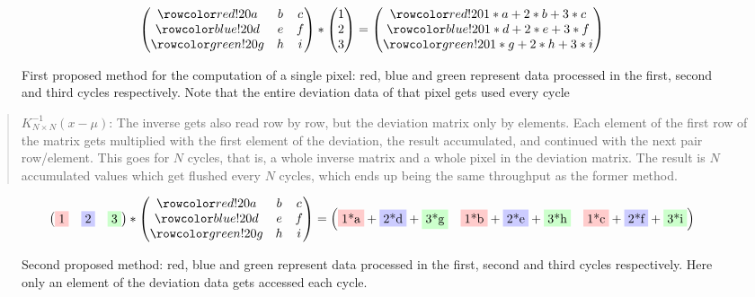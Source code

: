 \begin{figure}[h]%
\[
\begin{pmatrix}
\rr a & b & c \\ 
\br d & e & f \\ 
\gr g & h & i
\end{pmatrix}
*
\begin{pmatrix}
1\\
2\\
3
\end{pmatrix}
=
\begin{pmatrix}
\rr 1*a+2*b+3*c\\
\br 1*d+2*e+3*f\\
\gr 1*g+2*h+3*i
\end{pmatrix} 
\]
\caption[Optional: Short caption to appear in List of Figures]{First proposed method for the computation of a single pixel: red, blue and green represent data processed in the first, second and third cycles respectively. Note that the entire deviation data of that pixel gets used every cycle}
\end{figure}
\pagebreak
		
\begin{quote}
	\(K^{-1}_{N \times N} (x-\mu)\):
	The inverse gets also read row by row, but the deviation matrix only by elements. Each element of the first row of the matrix gets multiplied with the first element of the deviation, the result accumulated, and continued with the next pair row/element. This goes for \(N\) cycles, that is, a whole inverse matrix and a whole pixel in the deviation matrix. The result is \(N\) accumulated values which get flushed every \(N\) cycles, which ends up being the same throughput as the former method.
\end{quote}

\begin{figure}[h]%
\[
\begin{pmatrix}
\rb1 & \bb 2 & \gb 3
\end{pmatrix}
*
\begin{pmatrix}
\rr a & b & c \\ 
\br d & e & f \\ 
\gr g & h & i
\end{pmatrix}
=
\begin{pmatrix}
\rb{1*a}+\bb{2*d}+\gb{3*g} & \rb{1*b}+\bb{2*e}+\gb{3*h} & \rb{1*c}+\bb{2*f}+\gb{3*i}
\end{pmatrix} 
\]
\caption[Optional: Short caption to appear in List of Figures]{Second proposed method: red, blue and green represent data processed in the first, second and third cycles respectively. Here only an element of the deviation data gets accessed each cycle.}
\end{figure}

